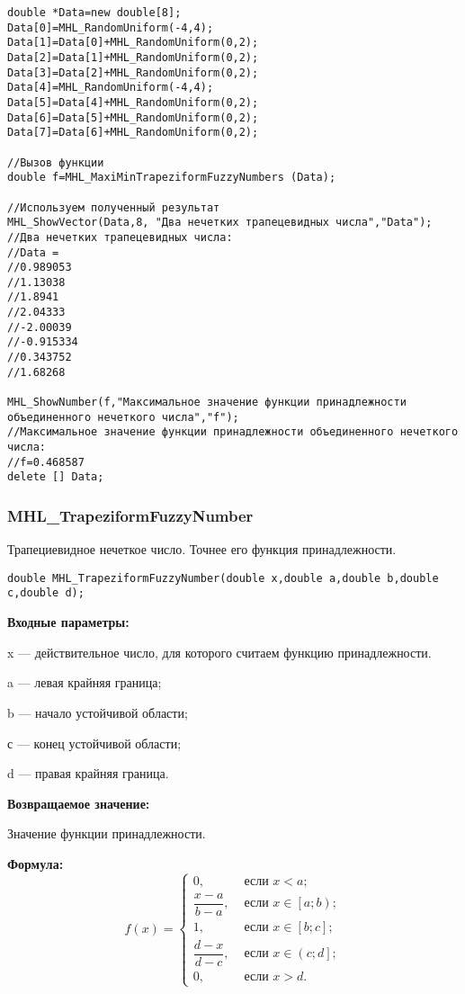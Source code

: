 \documentclass[a4paper,12pt]{article}
\begin{document}
\begin{lstlisting}[label=code_use_MHL_MaxiMinTrapeziformFuzzyNumbers,caption=Пример использования]
double *Data=new double[8];
Data[0]=MHL_RandomUniform(-4,4);
Data[1]=Data[0]+MHL_RandomUniform(0,2);
Data[2]=Data[1]+MHL_RandomUniform(0,2);
Data[3]=Data[2]+MHL_RandomUniform(0,2);
Data[4]=MHL_RandomUniform(-4,4);
Data[5]=Data[4]+MHL_RandomUniform(0,2);
Data[6]=Data[5]+MHL_RandomUniform(0,2);
Data[7]=Data[6]+MHL_RandomUniform(0,2);

//Вызов функции
double f=MHL_MaxiMinTrapeziformFuzzyNumbers (Data);

//Используем полученный результат
MHL_ShowVector(Data,8, "Два нечетких трапецевидных числа","Data");
//Два нечетких трапецевидных числа:
//Data =	
//0.989053
//1.13038
//1.8941
//2.04333
//-2.00039
//-0.915334
//0.343752
//1.68268

MHL_ShowNumber(f,"Максимальное значение функции принадлежности объединенного нечеткого числа","f");
//Максимальное значение функции принадлежности объединенного нечеткого числа:
//f=0.468587
delete [] Data;
\end{lstlisting}

\subsubsection{MHL\_TrapeziformFuzzyNumber}\label{MHL_TrapeziformFuzzyNumber}

Трапециевидное нечеткое число. Точнее его функция принадлежности.


\begin{lstlisting}[label=code_syntax_MHL_TrapeziformFuzzyNumber,caption=Синтаксис]
double MHL_TrapeziformFuzzyNumber(double x,double a,double b,double c,double d);
\end{lstlisting}

\textbf{Входные параметры:}
  
x --- действительное число, для которого считаем функцию принадлежности.
 
a --- левая крайняя граница;
 
b --- начало устойчивой области;
 
с --- конец устойчивой области;
 
d --- правая крайняя граница.

\textbf{Возвращаемое значение:}
 
Значение функции принадлежности.

\textbf{Формула:}
\begin{equation*}
f\left(x \right)=\left\lbrace \begin{aligned}  0,& \text{ если } x < a   ; \\\dfrac{x-a}{b-a},& \text{ если } x \in \left[ a; b\right)   ; \\1,& \text{ если } x \in \left[ b; c\right] ; \\\dfrac{d-x}{d-c},& \text{ если } x \in \left( c; d\right]   ; \\ 0,& \text{ если } x >d. \end{aligned}\right.
\end{equation*}
\end{document}
